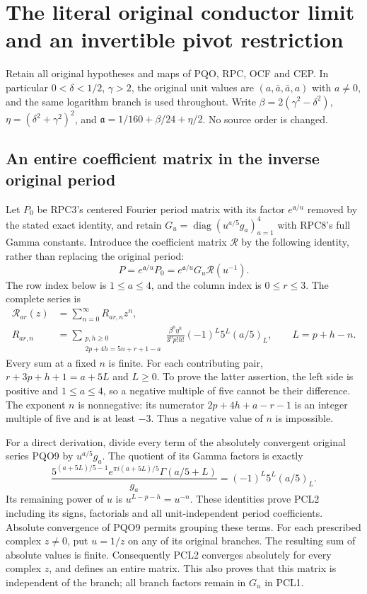 \section{The literal original conductor limit and an invertible pivot restriction}
\label{sec:PCL}
Retain all original hypotheses and maps of PQO, RPC, OCF and CEP.
In particular $0<\delta<1/2$, $\gamma>2$, the original unit values
are $(a,\bar a,\bar a,a)$ with $a\ne0$, and the same logarithm
branch is used throughout. Write $\beta=2(\gamma^2-\delta^2)$,
$\eta=(\delta^2+\gamma^2)^2$, and
$\mathfrak a=1/160+\beta/24+\eta/2$. No source order is changed.

\subsection{An entire coefficient matrix in the inverse original period}
Let $P_0$ be RPC3's centered Fourier period matrix with its factor
$e^{\mathfrak a/u}$ removed by the stated exact identity, and retain
$G_u=\operatorname{diag}(u^{a/5}g_a)_{a=1}^4$ with RPC8's full
Gamma constants. Introduce the coefficient matrix $\mathcal R$ by
the following identity, rather than replacing the original period:
\[
 P= e^{\mathfrak a/u}P_0
   = e^{\mathfrak a/u}G_u\mathcal R(u^{-1}).
 \tag{PCL1}
\]
The row index below is $1\le a\le4$, and the column index is
$0\le r\le3$. The complete series is
\[
 \begin{split}
 \mathcal R_{a r}(z)&=\sum_{n=0}^{\infty}R_{a r,n}z^n,\\
 R_{a r,n}&=
 \sum_{\substack{p,h\ge0\\2p+4h=5n+r+1-a}}
 \frac{\beta^p\eta^h}{3^p p!h!}
      (-1)^{L}5^L(a/5)_L,
 \qquad L=p+h-n.
 \end{split}\tag{PCL2}
\]
Every sum at a fixed $n$ is finite. For each contributing pair,
$r+3p+h+1=a+5L$ and $L\ge0$. To prove the latter assertion,
the left side is positive and $1\le a\le4$, so a negative multiple
of five cannot be their difference. The exponent $n$ is nonnegative:
its numerator $2p+4h+a-r-1$ is an integer multiple of five and is
at least $-3$. Thus a negative value of $n$ is impossible.

For a direct derivation, divide every term of the absolutely
convergent original series PQO9 by $u^{a/5}g_a$. The quotient of
its Gamma factors is exactly
\[
 \frac{5^{(a+5L)/5-1}e^{\pi i(a+5L)/5}
                  \Gamma(a/5+L)}{g_a}
        =(-1)^L5^L(a/5)_L.
 \tag{PCL3}
\]
Its remaining power of $u$ is $u^{L-p-h}=u^{-n}$.
These identities prove PCL2 including its signs, factorials and
all unit-independent period coefficients. Absolute convergence of
PQO9 permits grouping these terms. For each prescribed complex
$z\ne0$, put $u=1/z$ on any of its original branches. The resulting
sum of absolute values is finite. Consequently PCL2 converges
absolutely for every complex $z$, and defines an entire matrix.
This also proves that this matrix is independent of the branch;
all branch factors remain in $G_u$ in PCL1.

